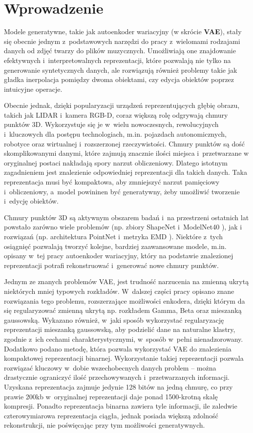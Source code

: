 \documentclass{iithesis}
\author         {Jakub Zadrożny}
\date           {6 września 2019}
\begin{document}
\chapter{Wprowadzenie}
Modele generatywne, takie jak autoenkoder wariacyjny (w skrócie \textbf{VAE}),
stały się obecnie jednym z~podstawowych narzędzi
do pracy z~wielomami rodzajami danych od zdjęć twarzy do plików muzycznych.
Umożliwiają one znajdowanie efektywnych i~interpretowalnych reprezentacji, które
pozwalają nie tylko na generowanie syntetycznych danych, ale rozwiązują również problemy takie
jak gładka inerpolacja pomiędzy dwoma obiektami, czy edycja obiektów poprzez intuicyjne operacje.

Obecnie jednak, dzięki popularyzacji urządzeń reprezentujących głębię obrazu,
takich jak LIDAR i~kamera RGB-D, coraz większą rolę odgrywają chmury punktów 3D.
Wykorzystuje się je w~wielu nowoczesnych, rewolucyjnych i~kluczowych dla postępu technologiach,
m.in. pojazdach autonomicznych, robotyce oraz wirtualnej i~rozszerzonej rzeczywistości.
Chmury punktów są dość skomplikowanymi danymi, które zajmują znacznie ilości miejsca i~przetwarzane
w oryginalnej postaci nakładają spory narzut obliczeniowy. Dlatego istotnym zagadnieniem
jest znalezienie odpowiedniej reprezentacji dla takich danych. Taka reprezentacja
musi być kompaktowa, aby zmniejszyć narzut pamięciowy i~obliczeniowy, a~model powininen być generatywny,
żeby umożliwić tworzenie i~edycję obiektów.

Chmury punktów 3D są aktywnym obszarem badań i~na przestrzeni ostatnich lat powstało zarówno
wiele problemów (np. zbiory ShapeNet \cite{shapenet} i~ModelNet40 \cite{modelnet}), jak i
rozwiązań (np. architektura PointNet \cite{pointnet} i~metryka EMD \cite{emd}).
Niektóre z~tych osiągnięć pozwalają tworzyć kolejne, bardziej zaawansowane modele,
m.in. opisany w~tej pracy autoenkoder wariacyjny, który na podstawie znalezionej reprezentacji
potrafi rekonstruować i~generować nowe chmury punktów.

Jednym ze znanych problemów VAE, jest trudność narzucenia na zmienną ukrytą niektórych mniej typowych rozkładów.
W~dalszej części pracy opisano znane rozwiązania tego problemu, rozszerzające możliwości enkodera,
dzięki którym da się regularyzować zmienną ukrytą np. rozkładem Gamma, Beta oraz mieszanką gaussowską.
Wykazano również, w~jaki sposób wykorzystać regularyzację reprezentacji mieszanką gaussowską,
aby podzielić dane na naturalne klastry, zgodnie z~ich cechami charakterystycznymi, w~sposób w~pełni nienadzorowany.
Dodatkowo podano metodę, która pozwala wykorzystać VAE do znalezienia kompaktowej reprezentacji binarnej.
Wykorzystanie takiej reprezentacji pozwala rozwiązać kluczowy w~dobie
wszechobecnych danych problem -- można drastycznie ograniczyć ilość przechowywanych i~przetwarzanych informacji.
Uzyskana reprezentacja zajmuje jedynie 128 bitów na jedną chmurę, co przy prawie 200kb w~oryginalnej
reprezentacji daje ponad 1500-krotną skalę kompresji.
Ponadto reprezentacja binarna zawiera tyle informacji, ile zaledwie czterowymiarowa
reprezentacja ciągła, jednak posiada większą zdolność rekonstrukcji, nie poświęcając
przy tym możliwości generatywnych.
\end{document}
